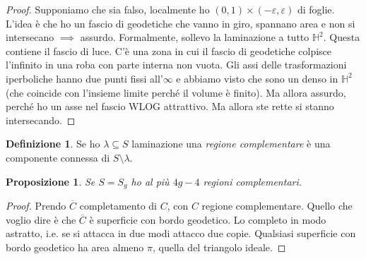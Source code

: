 \documentclass[a4paper]{article}
\newtheorem{proposition}{Proposizione}
\theoremstyle{definition}
\newtheorem{definition}{Definizione}
\begin{document}
    \begin{proof}
        Supponiamo che sia falso, localmente ho $(0,1) \times (-\varepsilon,\varepsilon)$ di foglie. L'idea è che ho un fascio di geodetiche che vanno in giro, spannano area e non si intersecano $\implies$ assurdo.
        Formalmente, sollevo la laminazione a tutto $\mathbb H^2$. Questa contiene il fascio di luce. C'è una zona in cui il fascio di geodetiche colpisce l'infinito in una roba con parte interna non vuota. Gli assi delle trasformazioni iperboliche hanno due punti fissi all'$\infty$ e abbiamo visto che sono un denso in $\mathbb H^2$ (che coincide con l'insieme limite perché il volume è finito). Ma allora assurdo, perché ho un asse nel fascio WLOG attrattivo. Ma allora ste rette si stanno intersecando.
    \end{proof}

    \begin{definition}
        Se ho $\lambda \subseteq S$ laminazione una \emph{regione complementare} è una componente connessa di $S \setminus \lambda$.
    \end{definition}

    \begin{proposition}
        Se $S = S_g$ ho al più $4g - 4$ regioni complementari.
    \end{proposition}

    \begin{proof}
        Prendo $\overline{C}$ completamento di $C$, con $C$ regione complementare. Quello che voglio dire è che $\overline{C}$ è superficie con bordo geodetico. Lo completo in modo astratto, i.e. se si attacca in due modi attacco due copie. Qualsiasi superficie con bordo geodetico ha area almeno $\pi$, quella del triangolo ideale.
    \end{proof}
\end{document}

